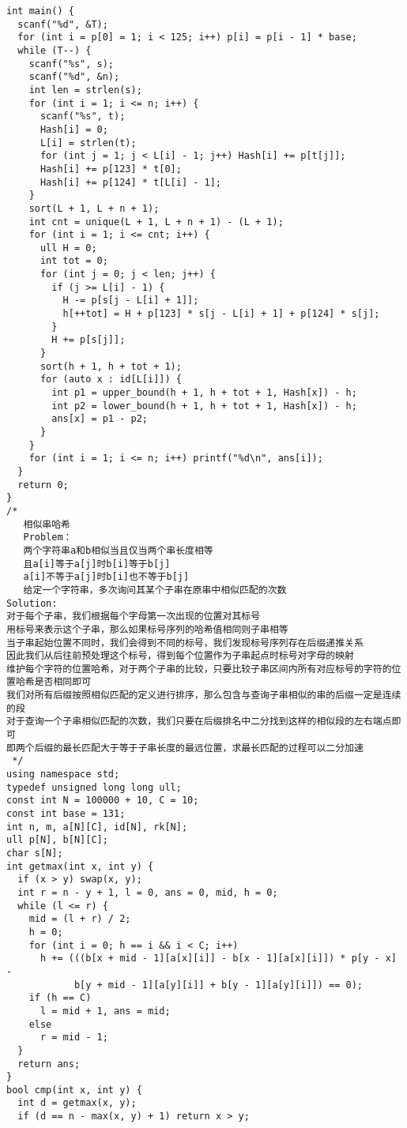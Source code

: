 \begin{lstlisting}
int main() {
  scanf("%d", &T);
  for (int i = p[0] = 1; i < 125; i++) p[i] = p[i - 1] * base;
  while (T--) {
    scanf("%s", s);
    scanf("%d", &n);
    int len = strlen(s);
    for (int i = 1; i <= n; i++) {
      scanf("%s", t);
      Hash[i] = 0;
      L[i] = strlen(t);
      for (int j = 1; j < L[i] - 1; j++) Hash[i] += p[t[j]];
      Hash[i] += p[123] * t[0];
      Hash[i] += p[124] * t[L[i] - 1];
    }
    sort(L + 1, L + n + 1);
    int cnt = unique(L + 1, L + n + 1) - (L + 1);
    for (int i = 1; i <= cnt; i++) {
      ull H = 0;
      int tot = 0;
      for (int j = 0; j < len; j++) {
        if (j >= L[i] - 1) {
          H -= p[s[j - L[i] + 1]];
          h[++tot] = H + p[123] * s[j - L[i] + 1] + p[124] * s[j];
        }
        H += p[s[j]];
      }
      sort(h + 1, h + tot + 1);
      for (auto x : id[L[i]]) {
        int p1 = upper_bound(h + 1, h + tot + 1, Hash[x]) - h;
        int p2 = lower_bound(h + 1, h + tot + 1, Hash[x]) - h;
        ans[x] = p1 - p2;
      }
    }
    for (int i = 1; i <= n; i++) printf("%d\n", ans[i]);
  }
  return 0;
}
/*
   相似串哈希
   Problem：
   两个字符串a和b相似当且仅当两个串长度相等
   且a[i]等于a[j]时b[i]等于b[j]
   a[i]不等于a[j]时b[i]也不等于b[j]
   给定一个字符串，多次询问其某个子串在原串中相似匹配的次数
Solution:
对于每个子串，我们根据每个字母第一次出现的位置对其标号
用标号来表示这个子串，那么如果标号序列的哈希值相同则子串相等
当子串起始位置不同时，我们会得到不同的标号，我们发现标号序列存在后缀递推关系
因此我们从后往前预处理这个标号，得到每个位置作为子串起点时标号对字母的映射
维护每个字符的位置哈希，对于两个子串的比较，只要比较子串区间内所有对应标号的字符的位置哈希是否相同即可
我们对所有后缀按照相似匹配的定义进行排序，那么包含与查询子串相似的串的后缀一定是连续的段
对于查询一个子串相似匹配的次数，我们只要在后缀排名中二分找到这样的相似段的左右端点即可
即两个后缀的最长匹配大于等于子串长度的最远位置，求最长匹配的过程可以二分加速
 */
using namespace std;
typedef unsigned long long ull;
const int N = 100000 + 10, C = 10;
const int base = 131;
int n, m, a[N][C], id[N], rk[N];
ull p[N], b[N][C];
char s[N];
int getmax(int x, int y) {
  if (x > y) swap(x, y);
  int r = n - y + 1, l = 0, ans = 0, mid, h = 0;
  while (l <= r) {
    mid = (l + r) / 2;
    h = 0;
    for (int i = 0; h == i && i < C; i++)
      h += (((b[x + mid - 1][a[x][i]] - b[x - 1][a[x][i]]) * p[y - x] -
            b[y + mid - 1][a[y][i]] + b[y - 1][a[y][i]]) == 0);
    if (h == C)
      l = mid + 1, ans = mid;
    else
      r = mid - 1;
  }
  return ans;
}
bool cmp(int x, int y) {
  int d = getmax(x, y);
  if (d == n - max(x, y) + 1) return x > y;

\end{lstlisting}
